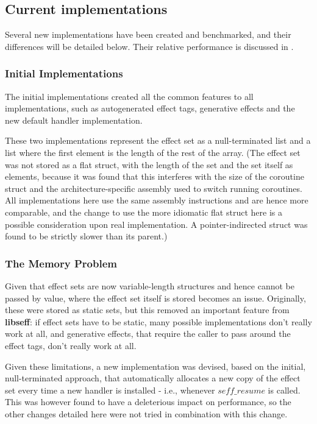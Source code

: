 \documentclass[logo,bsc,singlespacing,parskip,online]{infthesis}
\begin{document}
\subsection{Current implementations} \label{impls_here}

Several new implementations have been created and benchmarked, and their differences will be detailed below. Their relative performance is discussed in .

\subsubsection{Initial Implementations}

The initial implementations created all the common features to all implementations, such as autogenerated effect tags, generative effects and the new default handler implementation.

These two implementations represent the effect set as a null-terminated list and a list where the first element is the length of the rest of the array. (The effect set was not stored as a flat struct, with the length of the set and the set itself as elements, because it was found that this interferes with the size of the coroutine struct and the architecture-specific assembly used to switch running coroutines. All implementations here use the same assembly instructions and are hence more comparable, and the change to use the more idiomatic flat struct here is a possible consideration upon real implementation. A pointer-indirected struct was found to be strictly slower than its parent.)

\subsubsection{The Memory Problem}

Given that effect sets are now variable-length structures and hence cannot be passed by value, where the effect set itself is stored becomes an issue. Originally, these were stored as static sets, but this removed an important feature from \textbf{libseff}: if effect sets have to be static, many possible implementations don't really work at all, and generative effects, that require the caller to pass around the effect tags, don't really work at all.

Given these limitations, a new implementation was devised, based on the initial, null-terminated approach, that automatically allocates a new copy of the effect set every time a new handler is installed - i.e., whenever $seff\_resume$ is called. This was however found to have a deleterious impact on performance, so the other changes detailed here were not tried in combination with this change.
\end{document}
